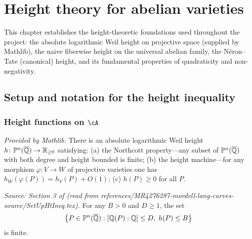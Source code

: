 \chapter{Height theory for abelian varieties}
\label{chap:weilheight}


This chapter establishes the height-theoretic foundations used throughout
the project: the absolute logarithmic Weil height on projective space
(supplied by Mathlib), the naive fiberwise height on the universal abelian
family, the Néron--Tate (canonical) height, and its fundamental properties
of quadraticity and non-negativity.

\section{Setup and notation for the height inequality}

\subsection{Height functions on $\cA$}

\begin{theorem}
  \label{thm:weil_height_mathlib}
  \mathlibok
  \textit{Provided by Mathlib.}
  There is an absolute logarithmic Weil height
  \(h \colon \mathbb{P}^n(\overline{\mathbb{Q}}) \to \mathbb{R}_{\ge 0}\)
  satisfying: (a) the Northcott property---any subset of \(\mathbb{P}^n(\overline{\mathbb{Q}})\)
  with both degree and height bounded is finite; (b) the height machine---for
  any morphism \(\varphi \colon V \to W\) of projective varieties one has
  \(h_W(\varphi(P)) = h_V(P) + O(1)\); (c) \(h(P) \ge 0\) for all \(P\).
\end{theorem}

\begin{lemma}
  \label{lem:northcott_ht}
  \textit{Source: Section 3 of \cite{MR4276287-mordell-lang-curves} (read from references/MR4276287-mordell-lang-curves-source/SetUpHtIneq.tex).}
  For any \(B > 0\) and \(D \ge 1\), the set
  \[
    \bigl\{ P \in \mathbb{P}^n(\overline{\mathbb{Q}}) : [\mathbb{Q}(P):\mathbb{Q}] \le D,\; h(P) \le B \bigr\}
  \]
  is finite.
\end{lemma}

